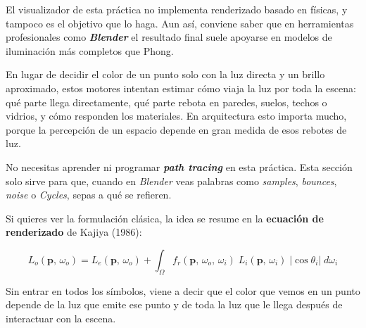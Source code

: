 \documentclass[
  spanish,
  11pt,
  a4paper,
  DIV=11,
  numbers=noendperiod]{scrartcl}
\begin{document}
El visualizador de esta práctica no implementa renderizado basado en físicas, y tampoco es el objetivo que lo haga. Aun así, conviene saber que en herramientas profesionales como \textbf{\emph{Blender}} el resultado final suele apoyarse en modelos de iluminación más completos que Phong.

En lugar de decidir el color de un punto solo con la luz directa y un brillo aproximado, estos motores intentan estimar cómo viaja la luz por toda la escena: qué parte llega directamente, qué parte rebota en paredes, suelos, techos o vidrios, y cómo responden los materiales. En arquitectura esto importa mucho, porque la percepción de un espacio depende en gran medida de esos rebotes de luz.

\begin{tcolorbox}[enhanced jigsaw, colframe=quarto-callout-note-color-frame, arc=.35mm, bottomrule=.15mm, left=2mm, breakable, opacityback=0, coltitle=black, bottomtitle=1mm, toptitle=1mm, titlerule=0mm, toprule=.15mm, rightrule=.15mm, title={Qué debes retener}, colbacktitle=quarto-callout-note-color!10!white, opacitybacktitle=0.6, colback=white, leftrule=.75mm]

No necesitas aprender ni programar \textbf{\emph{path tracing}} en esta práctica. Esta sección solo sirve para que, cuando en \emph{Blender} veas palabras como \emph{samples}, \emph{bounces}, \emph{noise} o \emph{Cycles}, sepas a qué se refieren.

\end{tcolorbox}

\begin{tcolorbox}[enhanced jigsaw, colframe=quarto-callout-tip-color-frame, arc=.35mm, bottomrule=.15mm, left=2mm, breakable, opacityback=0, coltitle=black, bottomtitle=1mm, toptitle=1mm, titlerule=0mm, toprule=.15mm, rightrule=.15mm, title={Detalle técnico opcional}, colbacktitle=quarto-callout-tip-color!10!white, opacitybacktitle=0.6, colback=white, leftrule=.75mm]

Si quieres ver la formulación clásica, la idea se resume en la \textbf{ecuación de renderizado} de Kajiya (1986):

\[
L_o(\mathbf{p},\,\omega_o) = L_e(\mathbf{p},\,\omega_o) + \int_{\Omega} f_r(\mathbf{p},\,\omega_o,\,\omega_i)\; L_i(\mathbf{p},\,\omega_i)\; |\cos\theta_i|\; d\omega_i
\]

Sin entrar en todos los símbolos, viene a decir que el color que vemos en un punto depende de la luz que emite ese punto y de toda la luz que le llega después de interactuar con la escena.

\end{tcolorbox}
\end{document}
